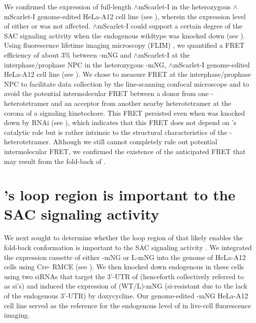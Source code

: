 We confirmed the expression of full-length $\wedge$mScarlet-I in the heterozygous $\wedge$mScarlet-I genome-edited HeLa-A12 cell line (see ), wherein the expression level of either  or  was not affected. $\wedge$mScarlet-I could support a certain degree of the SAC signaling activity when the endogenous wildtype  was knocked down (see ). Using fluorescence lifetime imaging microscopy (FLIM) \cite{FLIM}, we quantified a FRET efficiency of about 3\% between -mNG and $\wedge$mScarlet-I at the interphase/prophase NPC in the heterozygous -mNG, $\wedge$mScarlet-I genome-edited HeLa-A12 cell line (see ). We chose to measure FRET at the interphase/prophase NPC to facilitate data collection by the line-scanning confocal microscope and to avoid the potential intermolecular FRET between a donor from one - heterotetramer and an acceptor from another nearby heterotetramer at the corona of a signaling kinetochore. This FRET persisted even when  was knocked down by RNAi (see ), which indicates that this FRET does not depend on 's catalytic role but is rather intrinsic to the structural characteristics of the - heterotetramer. Although we still cannot completely rule out potential intermolecular FRET, we confirmed the existence of the anticipated FRET that may result from the fold-back of  .

\section{'s loop region is important to the SAC signaling activity }
\label{LoopDeletionSection}

We next sought to determine whether the loop region of  that likely enables the fold-back conformation is important to the SAC signaling activity . We integrated the expression cassette of either -mNG or \textDelta{}L-mNG into the genome of HeLa-A12 cells using Cre- RMCE (see ). We then knocked down endogenous  in these cells using two siRNAs that target the 3'-UTR of  \cite{siMAD1-3UTR} (henceforth collectively referred to as si's) and induced the expression of (WT/\textDelta{}L)-mNG (si-resistant due to the lack of the endogenous 3'-UTR) by doxycycline. Our genome-edited -mNG HeLa-A12 cell line served as the reference for the endogenous level of  in live-cell fluorescence imaging.


